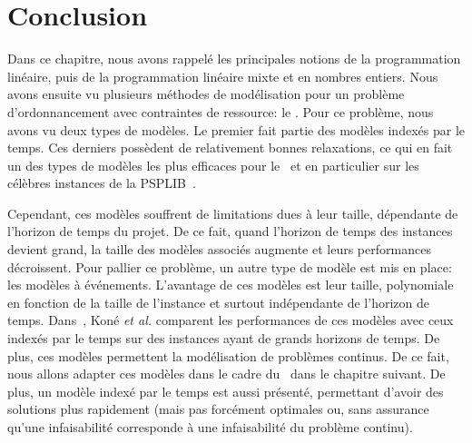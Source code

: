 \section*{Conclusion}

Dans ce chapitre, nous avons rappelé les principales notions de la
programmation linéaire, puis de la programmation linéaire mixte et en
nombres entiers. Nous avons ensuite vu plusieurs méthodes de
modélisation pour un problème d'ordonnancement avec contraintes de
ressource: le \RCPSP. Pour ce problème, nous avons vu deux types de
modèles. Le premier fait partie des modèles indexés par le temps. Ces
derniers possèdent de relativement bonnes relaxations, ce qui en fait
un des types de modèles les plus efficaces pour le \RCPSP~et en
particulier sur les célèbres instances de la PSPLIB~\cite{PSPLIB}. 

Cependant, ces modèles souffrent de limitations dues à leur taille,
dépendante de l'horizon de temps du projet. De ce fait, quand
l'horizon de temps des instances devient grand, la taille des modèles
associés augmente et leurs performances décroissent. Pour pallier ce
problème, un autre type de modèle est mis en place: les modèles à
événements. L'avantage de ces modèles est leur taille, polynomiale en
fonction de la taille de l'instance et surtout indépendante de
l'horizon de temps. Dans~\cite{modele_RCPSP}, Koné {\it et al.}
comparent les performances de ces modèles avec ceux indexés par le
temps sur des instances ayant de grands horizons de temps. De plus, ces
modèles permettent la modélisation de problèmes continus. De ce fait,
nous allons adapter ces modèles dans le cadre du \CECSP~dans le
chapitre suivant. De plus, un modèle indexé par le temps est aussi
présenté, permettant d'avoir des solutions plus rapidement (mais pas
forcément optimales ou, sans assurance qu'une infaisabilité
corresponde à une infaisabilité du problème continu). 